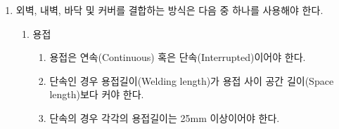 \documentclass[final,a4paper,10pt]{report}
\begin{document}
\begin{enumerate}
\begin{enumerate}
      \item\label{rule:formula-technical.accumulator-container-mechanical.mount-conditions.chassis-mount-construction} 축전지 박스를 섀시에 부착하는 모든 마운트는 다음과 같아야 한다.
        \begin{itemize}
          \item 최소 2mm 두께의 강철 또는 최소 4mm 두께의 알루미늄으로 제작
          \item 굽힘 하중을 전달하는 보강재가 있어야 한다.\\
            예시) 마운트가 부착되는 면을 아래 과 같이 XY 평면이라고 할 때, X와 Y축 굽힘 하중을 전달하는 보강재가 있어야 한다.
        \end{itemize}


      \item\label{rule:formula-technical.accumulator-container-mechanical.mount-conditions.bending-shear-tension-resistance} 모든 축전지 마운트, 섀시 마운트, 모노코크 마운트는 \ref{item:축전지박스 하중}의 시험 하중에 대한 굽힘, 순수 전단, 순수 인장을 견딜 수 있어야 한다. 용접 시 전단, 본드 접합 시 전단 및 인장에서 시험 하중을 견뎌야 한다.
    \end{enumerate}

  \item\label{rule:formula-technical.accumulator-container-mechanical.joining} 외벽, 내벽, 바닥 및 커버를 결합하는 방식은 다음 중 하나를 사용해야 한다.
    \begin{enumerate}
      \item\label{rule:formula-technical.accumulator-container-mechanical.joining.welding} 용접
        \begin{enumerate}
          \item\label{rule:formula-technical.accumulator-container-mechanical.joining.welding.continuous-or-interrupted} 용접은 연속(Continuous) 혹은 단속(Interrupted)이어야 한다.
          \item\label{rule:formula-technical.accumulator-container-mechanical.joining.welding.weld-length-exceeds-gap} 단속인 경우 용접길이(Welding length)가 용접 사이 공간 길이(Space length)보다 커야 한다.
          \item\label{rule:formula-technical.accumulator-container-mechanical.joining.welding.min-25mm-weld-length} 단속의 경우 각각의 용접길이는 25mm 이상이어야 한다.
        \end{enumerate}


\end{enumerate}
\end{enumerate}
\end{document}
